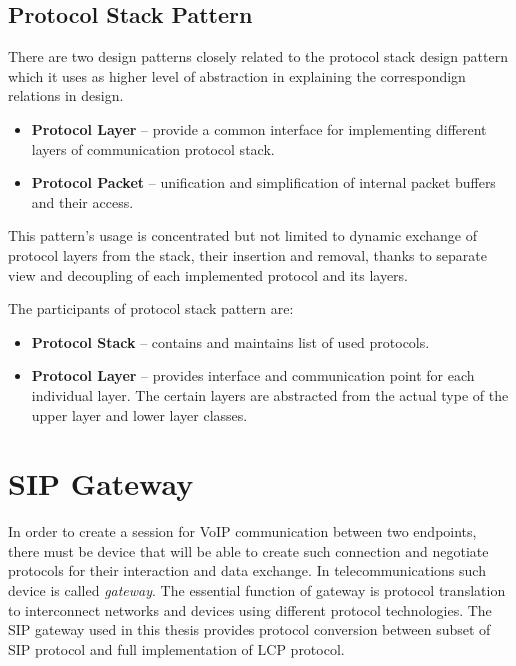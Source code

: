 
\subsection{Protocol Stack Pattern}
There are two design patterns closely related to the protocol stack design pattern
which it uses as higher level of abstraction in explaining the correspondign
relations in design.
\begin{itemize}
\item \textbf{Protocol Layer} -- provide a common interface for implementing
different layers of communication protocol stack.
\item \textbf{Protocol Packet} -- unification and simplification of internal
packet buffers and their access.
\end{itemize} 

This pattern's usage is concentrated but not limited to dynamic exchange of protocol
layers from the stack, their insertion and removal, thanks to separate view
and decoupling of each implemented protocol and its layers.

The participants of protocol stack pattern are:
\begin{itemize}
\item \textbf{Protocol Stack} -- contains and maintains list of used protocols.
\item \textbf{Protocol Layer} -- provides interface and communication point for 
each individual layer. The certain layers are abstracted from the actual type of
the upper layer and lower layer classes.
\end{itemize}





\section{SIP Gateway}
In order to create a session for VoIP communication between two endpoints, 
there must be device that will be able to create such connection and negotiate
protocols for their interaction and data exchange. In telecommunications such
device is called \textit{gateway}. The essential function of gateway is 
protocol translation to interconnect networks and devices using different
protocol technologies. The SIP gateway used in this thesis provides protocol
conversion between subset of SIP protocol and full implementation of LCP protocol.

